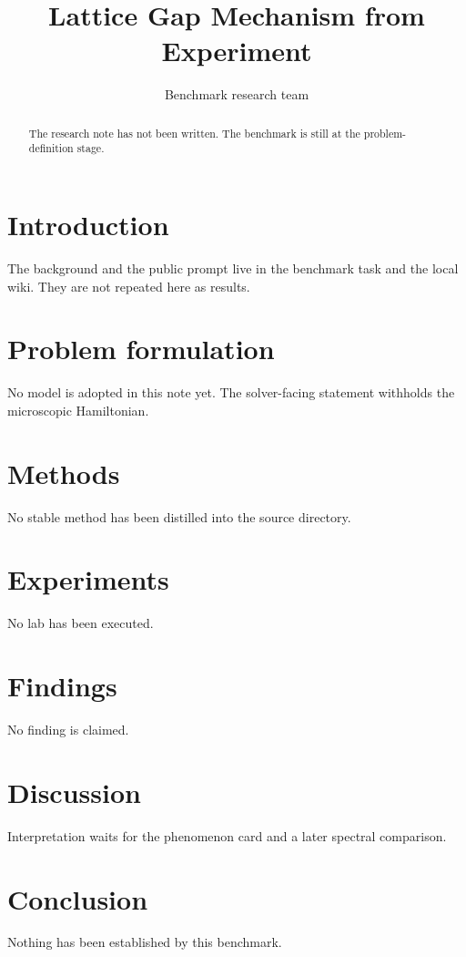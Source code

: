 \documentclass[11pt]{article}
\title{Lattice Gap Mechanism from Experiment}
\author{Benchmark research team}
\date{}
\begin{document}
\maketitle


\begin{abstract}
The research note has not been written. The benchmark is still at the problem-definition stage.
\end{abstract}

\section{Introduction}
The background and the public prompt live in the benchmark task and the local wiki. They are not repeated here as results.

\section{Problem formulation}
No model is adopted in this note yet. The solver-facing statement withholds the microscopic Hamiltonian.

\section{Methods}
No stable method has been distilled into the source directory.

\section{Experiments}
No lab has been executed.

\section{Findings}
No finding is claimed.

\section{Discussion}
Interpretation waits for the phenomenon card and a later spectral comparison.

\section{Conclusion}
Nothing has been established by this benchmark.



\end{document}
